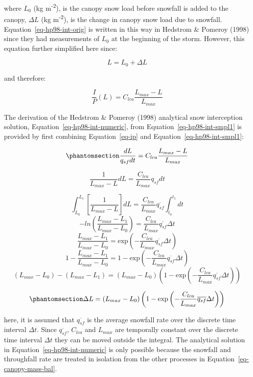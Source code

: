 \documentclass[
  letterpaper,
]{tex/uofsthesis-cs}
\begin{document}
where \(L_0\) (kg m\textsuperscript{-2}), is the canopy snow load before
snowfall is added to the canopy, \(\Delta L\) (kg
m\textsuperscript{-2}), is the change in canopy snow load due to
snowfall. Equation~\ref{eq-hp98-int-orig} is written in this way in
Hedstrom \& Pomeroy (1998) since they had measurements of \(L_0\) at the
beginning of the storm. However, this equation further simplified here
since:

\[
L = L_0 + \Delta L
\]

and therefore:

\[
\frac{I}{P}(L) = C_{lca}\frac{L_{max}-L}{L_{max}}
\]

The derivation of the Hedstrom \& Pomeroy (1998) analytical snow
interception solution, Equation~\ref{eq-hp98-int-numeric}, from
Equation~\ref{eq-hp98-int-smpl1} is provided by first combining
Equation~\ref{eq-ip} and Equation~\ref{eq-hp98-int-smpl1}:

\begin{equation}\phantomsection\label{eq-hp98-int-smpl}{
\frac{dL}{q_{sf} dt} = C_{lca}\frac{L_{max}-L}{L_{max}}
}\end{equation}

\[\frac{1}{L_{max}-L} dL = \frac{C_{lca}}{L_{max}} q_{sf} dt\]

\[
\int^{L_1}_{L_0}\left[\frac{1}{L_{max}-L}\right] dL =\frac{C_{lca}}{L_{max}} \overline{q_{sf}} \int^{t_1}_{t_0} dt \]
\[-ln\left(\frac{L_{max}-L_1}{L_{max}-L_0}\right)  = \frac{C_{lca}}{L_{max}} \overline{q_{sf}} \Delta t \]
\[\frac{L_{max}-L_1}{L_{max}-L_0} = \text{exp} \left(-\frac{C_{lca}}{L_{max}} \overline{q_{sf}} \Delta t \right)\]
\[1-\frac{L_{max}-L_1}{L_{max}-L_0} = 1- \text{exp} \left(-\frac{C_{lca}}{L_{max}} \overline{q_{sf}} \Delta t \right)\]
\[(L_{max}-L_0)-(L_{max}-L_1) = (L_{max}-L_0)\left(1- \text{exp} \left(-\frac{C_{lca}}{L_{max}} \overline{q_{sf}} \Delta t \right) \right)\]

\begin{equation}\phantomsection\label{eq-interception-integration-steps}{\Delta L = (L_{max}-L_0)\left(1- \text{exp} \left(-\frac{C_{lca}}{L_{max}} \overline{q_{sf}} \Delta t \right) \right)}\end{equation}

here, it is assumed that \(\overline{q_{sf}}\) is the average snowfall
rate over the discrete time interval \(\Delta t\). Since
\(\overline{q_{sf}}\), \(C_{lca}\) and \(L_{max}\) are temporally
constant over the discrete time interval \(\Delta t\) they can be moved
outside the integral. The analytical solution in
Equation~\ref{eq-hp98-int-numeric} is only possible because the snowfall
and throughfall rate are treated in isolation from the other processes
in Equation~\ref{eq-canopy-mass-bal}.
\end{document}
